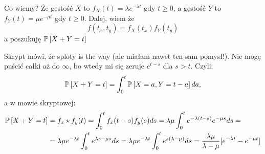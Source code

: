 \documentclass{article}
\begin{document}
Co wiemy? Że gęstość $X$ to $f_X(t)=\lambda e^{-\lambda t}$ gdy $t\geq 0$, a gęstość $Y$ to $f_Y(t)=\mu e^{-\mu t}$ gdy $t\geq 0$. Dalej, wiem że
$$f(t_x, t_y)=f_X(t_x)f_Y(t_y)$$
a poszukuję $\prob{X+Y=t}$

Skrypt mówi, że sploty is the way (ale miałam nawet ten sam pomysł!). Nie mogę puścić całki aż do $\infty$, bo wtedy mi się zeruje $e^{t-s}$ dla $s>t$. Czyli:
$$\prob{X+Y=t}=\int_0^t\prob{X=a, Y=t-a}da,$$
a w mowie skryptowej:
\begin{align*}
    \prob{X+Y=t}&=f_x\star f_y(t)=\int_0^t f_x(t-s)f_y(s)ds=\lambda\mu\int_0^t e^{-\lambda(t-s)}e^{-\mu s}ds=\\
    &=\lambda\mu e^{-\lambda t}\int_0^t e^{\lambda s-\mu s}ds=\lambda\mu e^{-\lambda t}\int_0^t e^{s(\lambda-\mu)}ds=\frac{\lambda\mu}{\lambda-\mu}[e^{-\lambda t}-e^{-\mu t}]
\end{align*}
\end{document}
